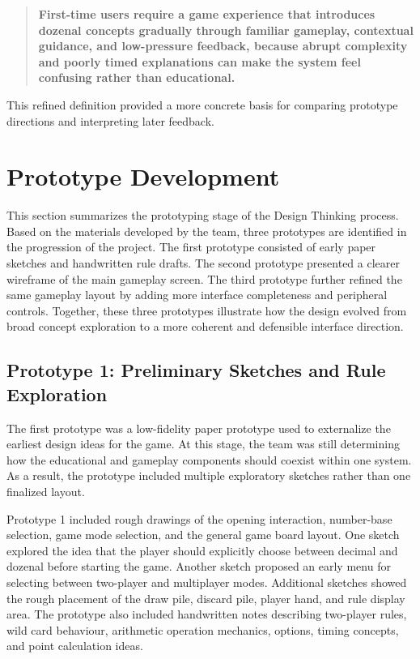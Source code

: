 \documentclass[12pt]{article}
\begin{document}
    \begin{quote}
        \textbf{First-time users require a game experience that introduces dozenal concepts gradually through familiar gameplay, contextual guidance, and low-pressure feedback, because abrupt complexity and poorly timed explanations can make the system feel confusing rather than educational.}
    \end{quote}

    This refined definition provided a more concrete basis for comparing prototype directions and interpreting later feedback.

    \section{Prototype Development}

    This section summarizes the prototyping stage of the Design Thinking process. Based on the materials developed by the team, three prototypes are identified in the progression of the project. The first prototype consisted of early paper sketches and handwritten rule drafts. The second prototype presented a clearer wireframe of the main gameplay screen. The third prototype further refined the same gameplay layout by adding more interface completeness and peripheral controls. Together, these three prototypes illustrate how the design evolved from broad concept exploration to a more coherent and defensible interface direction.

    \subsection{Prototype 1: Preliminary Sketches and Rule Exploration}

    The first prototype was a low-fidelity paper prototype used to externalize the earliest design ideas for the game. At this stage, the team was still determining how the educational and gameplay components should coexist within one system. As a result, the prototype included multiple exploratory sketches rather than one finalized layout.

    Prototype 1 included rough drawings of the opening interaction, number-base selection, game mode selection, and the general game board layout. One sketch explored the idea that the player should explicitly choose between decimal and dozenal before starting the game. Another sketch proposed an early menu for selecting between two-player and multiplayer modes. Additional sketches showed the rough placement of the draw pile, discard pile, player hand, and rule display area. The prototype also included handwritten notes describing two-player rules, wild card behaviour, arithmetic operation mechanics, options, timing concepts, and point calculation ideas.
\end{document}
